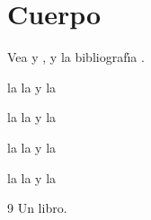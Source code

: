 \documentclass{report}
\begin{document}
\tableofcontents
\label{toc}
\listoftables
\label{lot}
\chapter{Cuerpo}
Vea  y , y la bibliograf\'{\i}a .

\begin{minipage}{0.9cm}
la  la  y la 
\end{minipage}
\begin{minipage}{1.1cm}
la  la  y la 
\end{minipage}
\begin{minipage}{1.3cm}
la  la  y la 
\end{minipage}
\begin{minipage}{1.6cm}
la  la  y la 
\end{minipage}
\begin{table}[h]\centering\caption{Una tabla}\end{table}
\begin{thebibliography}{9}
 Un libro.\label{bib}
\end{thebibliography}
\end{document}
